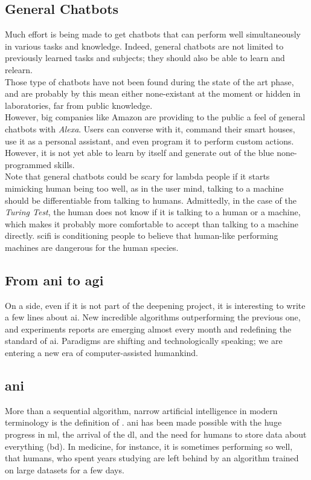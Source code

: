 \subsection{General Chatbots}
Much effort is being made to get chatbots that can perform well simultaneously in various tasks and knowledge. Indeed, general chatbots are not limited to previously learned tasks and subjects; they should also be able to learn and relearn.\\

Those type of chatbots have not been found during the state of the art phase, and are probably by this mean either none-existant at the moment or hidden in laboratories, far from public knowledge. \\

However, big companies like Amazon are providing to the public a feel of general chatbots with \textit{Alexa}\cite{chatbot:alexa}. Users can converse with it, command their smart houses, use it as a personal assistant, and even program it to perform custom actions. However, it is not yet able to learn by itself and generate out of the blue none-programmed skills.\\

Note that general chatbots could be scary for lambda people if it starts mimicking human being too well, as in the user mind, talking to a machine should be differentiable from talking to humans. Admittedly, in the case of the \textit{Turing Test}\cite{paper:turing}, the human does not know if it is talking to a human or a machine, which makes it probably more comfortable to accept than talking to a machine directly. \gls{scifi} is conditioning people to believe that human-like performing machines are dangerous for the human species.


\subsection{From \gls{ani} to \gls{agi}}
On a side, even if it is not part of the deepening project, it is interesting to write a few lines about \gls{ai}. New incredible algorithms outperforming the previous one, and experiments reports are emerging almost every month and redefining the standard of \gls{ai}. Paradigms are shifting and technologically speaking; we are entering a new era of computer-assisted humankind.

\subsection{\gls{ani}}
More than a sequential algorithm, narrow artificial intelligence in modern terminology is the definition of . \gls{ani} has been made possible with the huge progress in \gls{ml}, the arrival of the \gls{dl}, and the need for humans to store data about everything (\gls{bd}). In medicine, for instance, it is sometimes performing so well, that humans, who spent years studying are left behind by an algorithm trained on large datasets for a few days.

